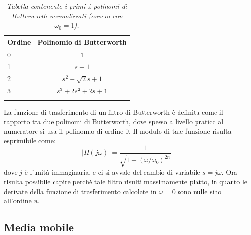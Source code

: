 \documentclass[a4paper, 12pt]{book}
\begin{document}
\begin{table}[h]
\centering
\begin{tabular}{lc}
\hline \rowcolor{darkgrayrow}
\textbf{Ordine} & \textbf{Polinomio di Butterworth}\\
\hline
    0  &  {$1$} \\
    1  &  {$s+1$} \\
    2  &  {$s^2+\sqrt{2}s+1$} \\
    3  &  {$s^3+2s^2+2s+1$} \\
\hline\\
\end{tabular}
\caption{\it{Tabella contenente i primi 4 polinomi di Butterworth normalizzati (ovvero                   con $\omega_0=1$).}}
\end{table}

La funzione di trasferimento di un filtro di Butterworth è definita come il rapporto tra due polinomi di Butterworth, dove spesso a livello pratico al numeratore si usa il polinomio di ordine 0.
Il modulo di tale funzione risulta esprimibile come:
\begin{equation}
	|H(j\omega)| = \frac{1}{\sqrt{1+(\omega / \omega_0)^{2n}}}
\end{equation}
dove $j$ è l'unità immaginaria, e ci si avvale del cambio di variabile $s = j\omega$.
Ora risulta possibile capire perché tale filtro risulti massimamente piatto, in quanto le derivate della funzione di trasferimento calcolate in $\omega = 0$ sono nulle sino all'ordine $n$.



\subsection{Media mobile}
\end{document}
